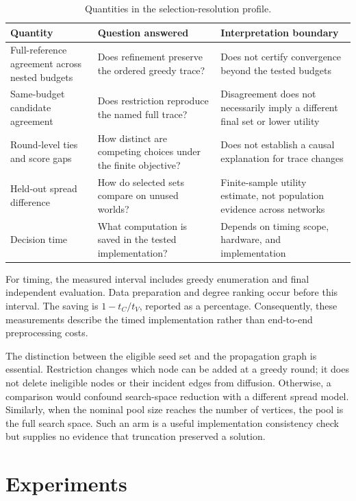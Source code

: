 \documentclass[smallextended]{svjour3}
\begin{document}
\begin{table}[tbp]
\caption{Quantities in the selection-resolution profile.}
\label{tab:1}
\begin{tabularx}{\linewidth}{@{}L{.25\linewidth}L{.32\linewidth}Y@{}}
\toprule
\textbf{Quantity} & \textbf{Question answered} & \textbf{Interpretation boundary} \\
\midrule
Full-reference agreement across nested budgets & Does refinement preserve the ordered greedy trace? & Does not certify convergence beyond the tested budgets \\
Same-budget candidate agreement & Does restriction reproduce the named full trace? & Disagreement does not necessarily imply a different final set or lower utility \\
Round-level ties and score gaps & How distinct are competing choices under the finite objective? & Does not establish a causal explanation for trace changes \\
Held-out spread difference & How do selected sets compare on unused worlds? & Finite-sample utility estimate, not population evidence across networks \\
Decision time & What computation is saved in the tested implementation? & Depends on timing scope, hardware, and implementation \\
\bottomrule
\end{tabularx}
\end{table}

For timing, the measured interval includes greedy enumeration and final independent evaluation. Data preparation and degree ranking occur before this interval. The saving is \(1-t_{C}/t_{V}\), reported as a percentage. Consequently, these measurements describe the timed implementation rather than end-to-end preprocessing costs.

The distinction between the eligible seed set and the propagation graph is essential. Restriction changes which node can be added at a greedy round; it does not delete ineligible nodes or their incident edges from diffusion. Otherwise, a comparison would confound search-space reduction with a different spread model. Similarly, when the nominal pool size reaches the number of vertices, the pool is the full search space. Such an arm is a useful implementation consistency check but supplies no evidence that truncation preserved a solution.


\section{Experiments}
\end{document}
